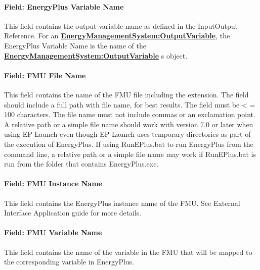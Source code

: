 \paragraph{Field: EnergyPlus Variable Name}\label{field-energyplus-variable-name}

This field contains the output variable name as defined in the InputOutput Reference. For an \textbf{\hyperref[energymanagementsystemoutputvariable]{EnergyManagementSystem:OutputVariable}}, the EnergyPlus Variable Name is the name of the \textbf{\hyperref[energymanagementsystemoutputvariable]{EnergyManagementSystem:OutputVariable}} s object.

\paragraph{Field: FMU File Name}\label{field-fmu-file-name-1}

This field contains the name of the FMU file including the extension. The field should include a full path with file name, for best results. The field must be \textless{} = 100 characters. The file name must not include commas or an exclamation point. A relative path or a simple file name should work with version 7.0 or later when using EP-Launch even though EP-Launch uses temporary directories as part of the execution of EnergyPlus. If using RunEPlus.bat to run EnergyPlus from the command line, a relative path or a simple file name may work if RunEPlus.bat is run from the folder that contains EnergyPlus.exe.

\paragraph{Field: FMU Instance Name}\label{field-fmu-instance-name}

This field contains the EnergyPlus instance name of the FMU. See External Interface Application guide for more details.

\paragraph{Field: FMU Variable Name}\label{field-fmu-variable-name}

This field contains the name of the variable in the FMU that will be mapped to the corresponding variable in EnergyPlus.

